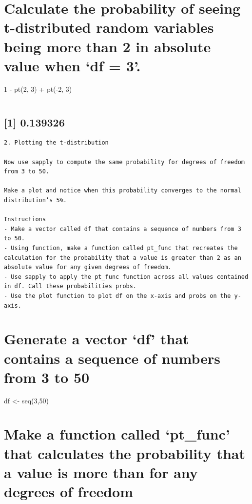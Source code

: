 \documentclass[
]{article}
\begin{document}
\hypertarget{calculate-the-probability-of-seeing-t-distributed-random-variables-being-more-than-2-in-absolute-value-when-df-3.}{%
\section{Calculate the probability of seeing t-distributed random
variables being more than 2 in absolute value when `df =
3'.}\label{calculate-the-probability-of-seeing-t-distributed-random-variables-being-more-than-2-in-absolute-value-when-df-3.}}

1 - pt(2, 3) + pt(-2, 3)

\begin{verbatim}
\end{verbatim}

\hypertarget{section-1}{%
\subsection{{[}1{]} 0.139326}\label{section-1}}

\begin{verbatim}
2. Plotting the t-distribution

Now use sapply to compute the same probability for degrees of freedom from 3 to 50.

Make a plot and notice when this probability converges to the normal distribution’s 5%.

Instructions
- Make a vector called df that contains a sequence of numbers from 3 to 50.
- Using function, make a function called pt_func that recreates the calculation for the probability that a value is greater than 2 as an absolute value for any given degrees of freedom.
- Use sapply to apply the pt_func function across all values contained in df. Call these probabilities probs.
- Use the plot function to plot df on the x-axis and probs on the y-axis.
\end{verbatim}

\hypertarget{generate-a-vector-df-that-contains-a-sequence-of-numbers-from-3-to-50}{%
\section{Generate a vector `df' that contains a sequence of numbers from
3 to
50}\label{generate-a-vector-df-that-contains-a-sequence-of-numbers-from-3-to-50}}

df \textless- seq(3,50)

\hypertarget{make-a-function-called-pt_func-that-calculates-the-probability-that-a-value-is-more-than-2-for-any-degrees-of-freedom}{%
\section{Make a function called `pt\_func' that calculates the
probability that a value is more than \textbar{} for any
degrees of
freedom}\label{make-a-function-called-pt_func-that-calculates-the-probability-that-a-value-is-more-than-2-for-any-degrees-of-freedom}}
\end{document}
